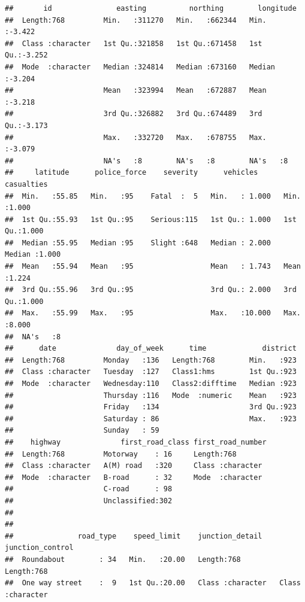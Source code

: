 \documentclass[
]{article}
\begin{document}
\begin{verbatim}
##       id               easting          northing        longitude     
##  Length:768         Min.   :311270   Min.   :662344   Min.   :-3.422  
##  Class :character   1st Qu.:321858   1st Qu.:671458   1st Qu.:-3.252  
##  Mode  :character   Median :324814   Median :673160   Median :-3.204  
##                     Mean   :323994   Mean   :672887   Mean   :-3.218  
##                     3rd Qu.:326882   3rd Qu.:674489   3rd Qu.:-3.173  
##                     Max.   :332720   Max.   :678755   Max.   :-3.079  
##                     NA's   :8        NA's   :8        NA's   :8       
##     latitude      police_force    severity      vehicles        casualties   
##  Min.   :55.85   Min.   :95    Fatal  :  5   Min.   : 1.000   Min.   :1.000  
##  1st Qu.:55.93   1st Qu.:95    Serious:115   1st Qu.: 1.000   1st Qu.:1.000  
##  Median :55.95   Median :95    Slight :648   Median : 2.000   Median :1.000  
##  Mean   :55.94   Mean   :95                  Mean   : 1.743   Mean   :1.224  
##  3rd Qu.:55.96   3rd Qu.:95                  3rd Qu.: 2.000   3rd Qu.:1.000  
##  Max.   :55.99   Max.   :95                  Max.   :10.000   Max.   :8.000  
##  NA's   :8                                                                   
##      date              day_of_week      time             district  
##  Length:768         Monday   :136   Length:768        Min.   :923  
##  Class :character   Tuesday  :127   Class1:hms        1st Qu.:923  
##  Mode  :character   Wednesday:110   Class2:difftime   Median :923  
##                     Thursday :116   Mode  :numeric    Mean   :923  
##                     Friday   :134                     3rd Qu.:923  
##                     Saturday : 86                     Max.   :923  
##                     Sunday   : 59                                  
##    highway              first_road_class first_road_number 
##  Length:768         Motorway    : 16     Length:768        
##  Class :character   A(M) road   :320     Class :character  
##  Mode  :character   B-road      : 32     Mode  :character  
##                     C-road      : 98                       
##                     Unclassified:302                       
##                                                            
##                                                            
##               road_type    speed_limit    junction_detail    junction_control  
##  Roundabout        : 34   Min.   :20.00   Length:768         Length:768        
##  One way street    :  9   1st Qu.:20.00   Class :character   Class :character  

\end{verbatim}
\end{document}
